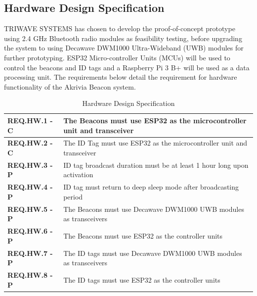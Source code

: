 \subsection{Hardware Design Specification}
\medskip
TRIWAVE SYSTEMS has chosen to develop the proof-of-concept prototype using 2.4 GHz Bluetooth radio modules as feasibility testing, before upgrading the system to using Decawave DWM1000 Ultra-Wideband (UWB) modules for further prototyping. ESP32 Micro-controller Units (MCUs) will be used to control the beacons and ID tags and a Raspberry Pi 3 B+ will be used as a data processing unit. The requirements below detail the requirement for hardware functionality of the Akrivia Beacon system.
\medskip
\bgroup
\def\arraystretch{1.5}
\begin{table}[H]
\centering
\begin{tabular}{ | m{3cm} | m{12.5cm} |}
\hline
\textbf{REQ.HW.1 - C} & The Beacons must use ESP32 as the microcontroller unit and transceiver \\
\hline
\textbf{REQ.HW.2 - C} & The ID Tag must use ESP32 as the microcontroller unit and transceiver \\
\hline
\textbf{REQ.HW.3 - P} & ID tag broadcast duration must be at least 1 hour long upon activation\\
\hline
\textbf{REQ.HW.4 - P} & ID tag must return to deep sleep mode after broadcasting period\\
\hline
\textbf{REQ.HW.5 - P} & The Beacons must use Decawave DWM1000 UWB modules as transceivers\\
\hline
\textbf{REQ.HW.6 - P} & The Beacons must use ESP32 as the controller units\\
\hline
\textbf{REQ.HW.7 - P} & The ID tags must use Decawave DWM1000 UWB modules as transceivers\\
\hline
\textbf{REQ.HW.8 - P} & The ID tags must use ESP32 as the controller units\\
\hline
\end{tabular}
\caption{Hardware Design Specification}
\end{table}







